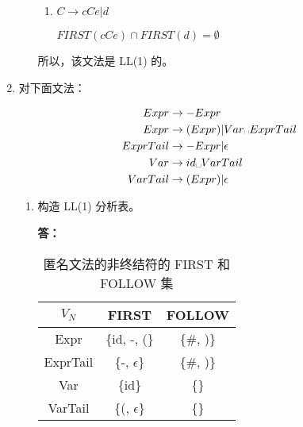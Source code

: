 \begin{enumerate}
\begin{enumerate}
\begin{enumerate}
            \item $C \to cCe | d$
            
            $FIRST(cCe) \cap FIRST(d) = \emptyset$
            
        \end{enumerate}
        
        所以，该文法是 LL(1) 的。
        
    \end{enumerate}
    
    \item 对下面文法：
    
    \begin{align*}
        Expr & \to -Expr \\
        Expr & \to (Expr) | Var \text{\textvisiblespace} ExprTail \\
        ExprTail & \to -Expr | \epsilon \\
        Var & \to id \text{\textvisiblespace} VarTail \\
        VarTail & \to (Expr) | \epsilon
    \end{align*}
    
    \begin{enumerate}
        \item 构造 LL(1) 分析表。
        
        \textbf{答：}
                
        \begin{table}[H]
            \centering
            \begin{tabular}{|c|c|c|}
                \hline
                $V_N$ & FIRST & FOLLOW \\
                \hline
                Expr & \{id, -, (\} & \{\#, )\} \\
                \hline
                ExprTail & \{-, $\epsilon$\} & \{\#, )\} \\
                \hline
                Var & \{id\} & \{\textvisiblespace\} \\
                \hline
                VarTail & \{(, $\epsilon$\} & \{\textvisiblespace\} \\
                \hline
            \end{tabular}
            \caption{匿名文法的非终结符的 FIRST 和 FOLLOW 集}
            \label{tab:FF4}
        \end{table}
        

\end{enumerate}
\end{enumerate}
